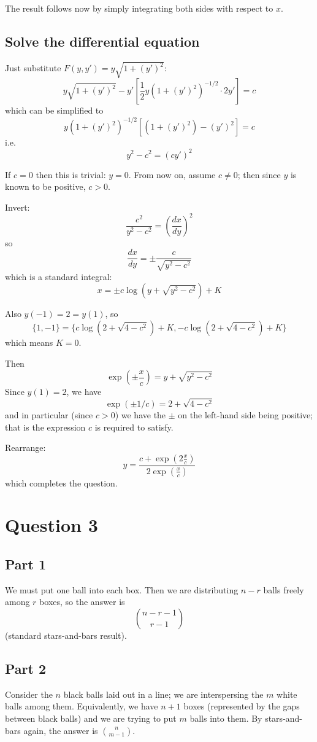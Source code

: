 \documentclass[11pt]{amsart}
\begin{document}
The result follows now by simply integrating both sides with respect to $x$.

\subsection{Solve the differential equation}

Just substitute $F(y,y') = y \sqrt{1+(y')^2}$:
$$y\sqrt{1+(y')^2} - y' \left[ \frac{1}{2} y (1+(y')^2)^{-1/2} \cdot 2 y'\right] = c$$
which can be simplified to $$y (1+(y')^2)^{-1/2} \left[ (1+(y')^2) -(y')^2\right] = c$$
i.e. $$y^2 - c^2 = (c y')^2$$

If $c=0$ then this is trivial: $y=0$. From now on, assume $c \not = 0$; then since $y$ is known to be positive, $c > 0$.

Invert: $$\frac{c^2}{y^2-c^2} = \left(\frac{dx}{dy}\right)^2$$
so $$\dfrac{dx}{dy} = \pm \frac{c}{\sqrt{y^2-c^2}}$$
which is a standard integral: $$x = \pm c \log(y+\sqrt{y^2-c^2}) + K$$

Also $y(-1) = 2 = y(1)$, so $$\{1,-1\} = \{c \log(2+\sqrt{4-c^2}) + K, -c \log(2+\sqrt{4-c^2}) + K\}$$
which means $K = 0$.

Then $$\exp\left(\pm \frac{x}{c}\right) = y+\sqrt{y^2-c^2}$$
Since $y(1) = 2$, we have $$\exp(\pm 1/c) = 2+\sqrt{4-c^2}$$ and in particular (since $c>0$) we have the $\pm$ on the left-hand side being positive; that is the expression $c$ is required to satisfy.

Rearrange: $$y = \frac{c+\exp(2 \frac{x}{c})}{2 \exp\left(\frac{x}{c}\right)}$$
which completes the question.

\section{Question 3}
\subsection{Part 1}
We must put one ball into each box. Then we are distributing $n-r$ balls freely among $r$ boxes, so the answer is $$\binom{n-r-1}{r-1}$$
(standard stars-and-bars result).

\subsection{Part 2}
Consider the $n$ black balls laid out in a line; we are interspersing the $m$ white balls among them.
Equivalently, we have $n+1$ boxes (represented by the gaps between black balls) and we are trying to put $m$ balls into them.
By stars-and-bars again, the answer is $\binom{n}{m-1}$.
\end{document}
